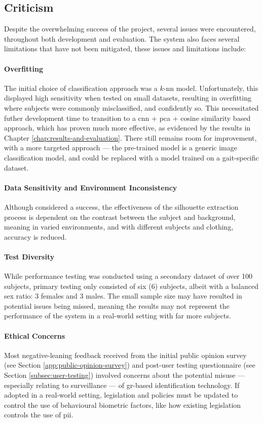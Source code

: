 \subsection{Criticism}

Despite the overwhelming success of the project, several issues were encountered, throughout both development and evaluation. 
The system also faces several limitations that have not been mitigated, these issues and limitations include:

\paragraph{Overfitting} The initial choice of classification approach was a $k$-\ac{nn} model. 
Unfortunately, this displayed high sensitivity when tested on small datasets, resulting in overfitting where subjects were commonly misclassified, and confidently so.
This necessitated futher development time to transition to a \ac{cnn} + \ac{pca} + cosine similarity based approach, which has proven much more effective, as evidenced by the results in Chapter \ref{chap:results-and-evaluation}.
There still remains room for improvement, with a more targeted approach --- the pre-trained  model is a generic image classification model, and could be replaced with a model trained on a gait-specific dataset.

\paragraph{Data Sensitivity and Environment Inconsistency} Although considered a success, the effectiveness of the silhouette extraction process is dependent on the contrast between the subject and background, meaning in varied environments, and with different subjects and clothing, accuracy is reduced.

\paragraph{Test Diversity} While performance testing was conducted using a secondary dataset of over 100 subjects, primary testing only consisted of six (6) subjects, albeit with a balanced sex ratio: 3 females and 3 males.
The small sample size may have resulted in potential issues being missed, meaning the results may not represent the performance of the system in a real-world setting with far more subjects.

\paragraph{Ethical Concerns} Most negative-leaning feedback received from the initial public opinion survey (see Section \ref{app:public-opinion-survey}) and post-user testing questionnaire (see Section \ref{subsec:user-testing}) involved concerns about the potential misuse --- especially relating to surveillance --- of \ac{gr}-based identification technology.
If adopted in a real-world setting, legislation and policies must be updated to control the use of behavioural biometric factors, like how existing legislation controls the use of \ac{pii}.



